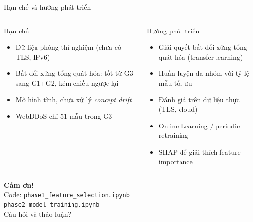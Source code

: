 \documentclass[aspectratio=169,12pt]{beamer}
\begin{document}
\begin{frame}{Hạn chế và hướng phát triển}
  \begin{columns}[T]
      \begin{alertblock}{Hạn chế}
        \begin{itemize}
          \item Dữ liệu phòng thí nghiệm (chưa có TLS, IPv6)
          \item Bất đối xứng tổng quát hóa: tốt từ G3 sang G1+G2, kém chiều ngược lại
          \item Mô hình tĩnh, chưa xử lý \textit{concept drift}
          \item WebDDoS chỉ 51 mẫu trong G3
        \end{itemize}
      \end{alertblock}
      \begin{block}{Hướng phát triển}
        \begin{itemize}
          \item Giải quyết bất đối xứng tổng quát hóa (transfer learning)
          \item Huấn luyện đa nhóm với tỷ lệ mẫu tối ưu
          \item Đánh giá trên dữ liệu thực (TLS, cloud)
          \item Online Learning / periodic retraining
          \item SHAP để giải thích feature importance
        \end{itemize}
      \end{block}
  \end{columns}
\end{frame}

\begin{frame}
  \begin{center}
    \vspace{1em}
    {\Large\textbf{Cảm ơn!}}\\[1em]
    \normalsize
    Code: \texttt{phase1\_feature\_selection.ipynb}\\
    \texttt{phase2\_model\_training.ipynb}\\[1em]
    {\large Câu hỏi và thảo luận?}
  \end{center}
\end{frame}

\appendix
\end{document}
